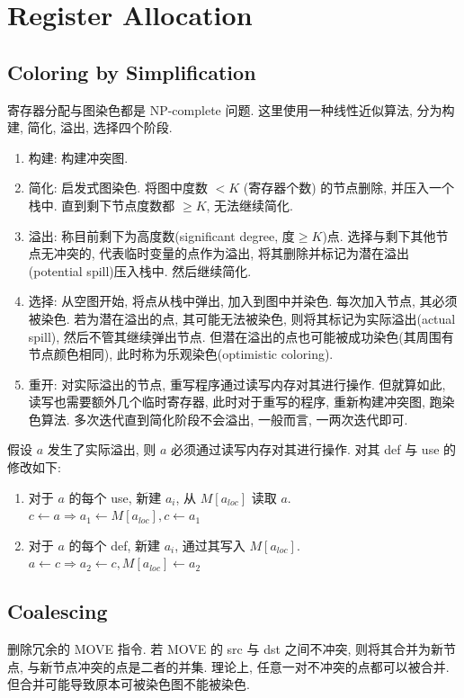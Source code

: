 \section{Register Allocation}

\subsection{Coloring by Simplification}
寄存器分配与图染色都是 NP-complete 问题. 这里使用一种线性近似算法, 分为构建, 简化, 溢出, 选择四个阶段. 


\begin{enumerate}
    \item 构建: 构建冲突图.
    \item 简化: 启发式图染色. 将图中度数 $<K$ (寄存器个数) 的节点删除, 并压入一个栈中. 直到剩下节点度数都 $\ge K$, 无法继续简化. 
    \item 溢出: 称目前剩下为高度数(significant degree, 度$\ge K$)点. 选择与剩下其他节点无冲突的, 代表临时变量的点作为溢出, 将其删除并标记为潜在溢出(potential spill)压入栈中. 然后继续简化. 
    \item 选择: 从空图开始, 将点从栈中弹出, 加入到图中并染色.  每次加入节点, 其必须被染色. 
    \subitem 若为潜在溢出的点, 其可能无法被染色, 则将其标记为实际溢出(actual spill), 然后不管其继续弹出节点. 
    \subitem 但潜在溢出的点也可能被成功染色(其周围有节点颜色相同), 此时称为乐观染色(optimistic coloring).
    \item 重开: 对实际溢出的节点, 重写程序通过读写内存对其进行操作. 但就算如此, 读写也需要额外几个临时寄存器, 此时对于重写的程序, 重新构建冲突图, 跑染色算法. 多次迭代直到简化阶段不会溢出, 一般而言, 一两次迭代即可. 
\end{enumerate}


假设 $a$ 发生了实际溢出, 则 $a$ 必须通过读写内存对其进行操作. 对其 def 与 use 的修改如下:
\begin{enumerate}
    \item 对于 $a$ 的每个 use, 新建 $a_i$, 从 $M[a_{loc}]$ 读取 $a$. 
    \subitem $c\leftarrow a \Rightarrow a_1\leftarrow M[a_{loc}], c\leftarrow a_1$
    \item 对于 $a$ 的每个 def, 新建 $a_i$, 通过其写入 $M[a_{loc}]$.
    \subitem $a\leftarrow c \Rightarrow a_2\leftarrow c, M[a_{loc}]\leftarrow a_2$
\end{enumerate}


\subsection{Coalescing}
删除冗余的 MOVE 指令. 若 MOVE 的 src 与 dst 之间不冲突, 则将其合并为新节点, 与新节点冲突的点是二者的并集. 理论上, 任意一对不冲突的点都可以被合并. 但合并可能导致原本可被染色图不能被染色. 

